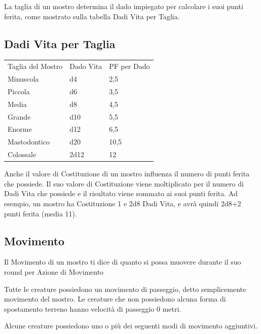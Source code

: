 \begin{multicols}{2}
La taglia di un mostro determina il dado impiegato per calcolare i suoi punti ferita, come mostrato sulla tabella Dadi Vita per Taglia.

\subsection{Dadi Vita per Taglia}

\medskip
\begin{tabular}{lll}
\toprule
Taglia del Mostro & Dado Vita & PF per Dado\\
Minuscola &d4&2,5\\
Piccola &d6&3,5\\
Media&d8 &4,5\\
Grande&d10&5,5\\
Enorme&d12&6,5\\
Mastodontico&d20&10,5\\
Colossale&2d12&12\\
\end{tabular}
\medskip

Anche il valore di Costituzione di un mostro influenza il numero di punti ferita che possiede. Il suo valore di Costituzione viene moltiplicato per il numero di Dadi Vita che possiede e il risultato viene sommato ai suoi punti ferita. Ad esempio, un mostro ha Costituzione 1 e 2d8 Dadi Vita, e avrà quindi 2d8+2 punti ferita (media 11).

\subsection{Movimento}

Il Movimento di un mostro ti dice di quanto si possa muovere durante il suo round per Azione di Movimento

Tutte le creature possiedono un movimento di passeggio, detto semplicemente movimento del mostro. Le creature che non possiedono alcuna forma di spostamento terreno hanno velocità di passeggio 0 metri.

Alcune creature possiedono uno o più dei seguenti modi di movimento aggiuntivi.


\end{multicols}
